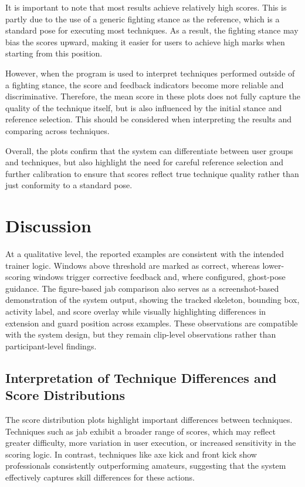 \documentclass[12pt]{article}
\begin{document}
It is important to note that most results achieve relatively high scores. This is partly due to the use of a generic fighting stance as the reference, which is a standard pose for executing most techniques. As a result, the fighting stance may bias the scores upward, making it easier for users to achieve high marks when starting from this position.

However, when the program is used to interpret techniques performed outside of a fighting stance, the score and feedback indicators become more reliable and discriminative. Therefore, the mean score in these plots does not fully capture the quality of the technique itself, but is also influenced by the initial stance and reference selection. This should be considered when interpreting the results and comparing across techniques.

Overall, the plots confirm that the system can differentiate between user groups and techniques, but also highlight the need for careful reference selection and further calibration to ensure that scores reflect true technique quality rather than just conformity to a standard pose.

\section{Discussion}
At a qualitative level, the reported examples are consistent with the intended trainer logic. Windows above threshold are marked as correct, whereas lower-scoring windows trigger corrective feedback and, where configured, ghost-pose guidance. The figure-based jab comparison also serves as a screenshot-based demonstration of the system output, showing the tracked skeleton, bounding box, activity label, and score overlay while visually highlighting differences in extension and guard position across examples. These observations are compatible with the system design, but they remain clip-level observations rather than participant-level findings.

\subsection*{Interpretation of Technique Differences and Score Distributions}

The score distribution plots highlight important differences between techniques. Techniques such as jab exhibit a broader range of scores, which may reflect greater difficulty, more variation in user execution, or increased sensitivity in the scoring logic. In contrast, techniques like axe kick and front kick show professionals consistently outperforming amateurs, suggesting that the system effectively captures skill differences for these actions.
\end{document}
